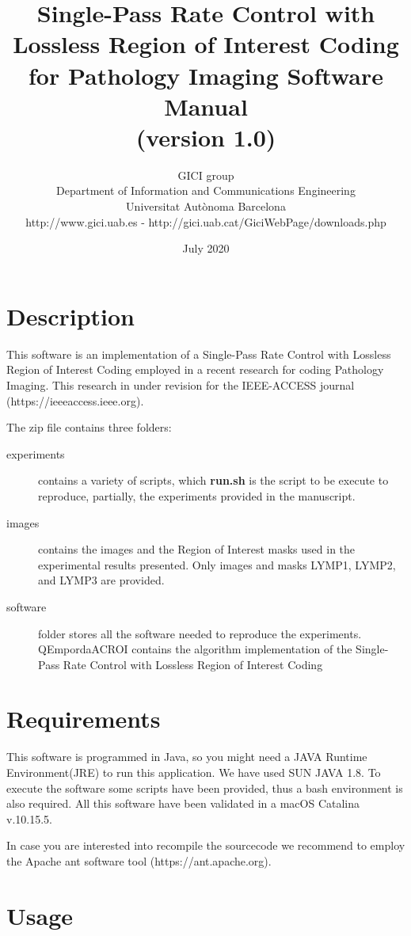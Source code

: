 \documentclass[a4paper,10pt]{article}
\title{Single-Pass Rate Control with Lossless Region of Interest Coding for Pathology Imaging Software Manual \\ \small (version 1.0)}
\author{
GICI group \vspace{0.1cm} \\
\small Department of Information and Communications Engineering \\
\small Universitat Aut{\`o}noma Barcelona \\
\small http://www.gici.uab.es  -  http://gici.uab.cat/GiciWebPage/downloads.php \\
}
\date{July 2020}
\begin{document}
\maketitle

\section{Description}

This software is an implementation of a Single-Pass Rate Control with Lossless Region of Interest Coding employed in a recent research for coding Pathology Imaging. This research in under revision for the IEEE-ACCESS journal  (https://ieeeaccess.ieee.org).

\noindent 
The zip file contains three folders:

\begin{description}
\item[experiments] contains a variety of scripts, which \textbf{run.sh} is the script to be execute to reproduce, partially, the experiments provided in the manuscript.
\item[images] contains the images and the Region of Interest masks used in the experimental results presented. Only images and masks LYMP1, LYMP2, and LYMP3 are provided.
\item[software] folder stores all the software needed to reproduce the experiments. QEmpordaACROI contains the algorithm implementation of the Single-Pass Rate Control with Lossless Region of Interest Coding
\end{description}

\section{Requirements}

This software is programmed in Java, so you might need a JAVA Runtime Environment(JRE) to run this application.
We have used SUN JAVA 1.8. To execute the software some scripts have been provided, thus a bash environment is also required. All this software have been validated in a macOS Catalina v.10.15.5.

\noindent
In case you are interested into recompile the sourcecode we recommend to employ the Apache ant software tool (https://ant.apache.org).

\section{Usage}
\end{document}
